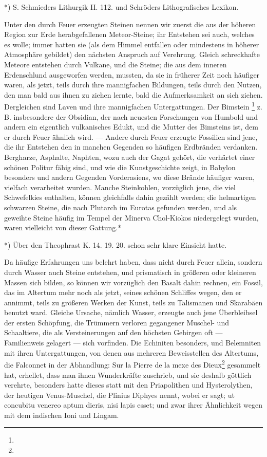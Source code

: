 \documentclass[a4paper, 11pt, oneside, polutonikogreek, german]{article}
\begin{document}
*) S. Schmieders Lithurgik II. 112. und Schröders Lithografisches Lexikon.

Unter den durch Feuer erzeugten Steinen nennen wir zuerst die aus der höheren Region zur Erde herabgefallenen Meteor-Steine; ihr Entstehen sei auch, welches es wolle; immer hatten sie (als dem Himmel entfallen oder mindestens in höherer Atmosphäre gebildet) den nächsten Anspruch auf Verehrung. Gleich schreckhafte Meteore entstehen durch Vulkane, und die Steine; die aus dem inneren Erdenschlund ausgeworfen werden, mussten, da sie in früherer Zeit noch häufiger waren, als jetzt, teils durch ihre mannigfachen Bildungen, teils durch den Nutzen, den man bald aus ihnen zu ziehen lernte, bald die Aufmerksamkeit an sich ziehen. Dergleichen sind Laven und ihre mannigfachen Untergattungen. Der Bimstein \footnote{} z. B. insbesondere der Obsidian, der nach neuesten Forschungen von Humbold und andern ein eigentlich vulkanisches Edukt, und die Mutter des Bimsteins ist, dem er durch Feuer ähnlich wird. --- Andere durch Feuer erzeugte Fossilien sind jene, die ihr Entstehen den in manchen Gegenden so häufigen Erdbränden verdanken. Bergharze, Asphalte, Naphten, wozu auch der Gagat gehört, die verhärtet einer schönen Politur fähig sind, und wie die Kunstgeschichte zeigt, in Babylon besonders und andern Gegenden Vorderasiens, wo diese Brände häufiger waren, vielfach verarbeitet wurden. Manche Steinkohlen, vorzüglich jene, die viel Schwefelkies enthalten, können gleichfalls dahin gezählt werden; die helmartigen schwarzen Steine, die nach Plutarch im Eurotas gefunden werden, und als geweihte Steine häufig im Tempel der Minerva Chol-Kiokos niedergelegt wurden, waren vielleicht von dieser Gattung.*

*) Über den Theophrast K. 14. 19. 20. schon sehr klare Einsicht hatte.

Da häufige Erfahrungen uns belehrt haben, dass nicht durch Feuer allein, sondern durch Wasser auch Steine entstehen, und prismatisch in größeren oder kleineren Massen sich bilden, so können wir vorzüglich den Basalt dahin rechnen, ein Fossil, das im Altertum mehr noch als jetzt, seines schönen Schliffes wegen, den er annimmt, teils zu größeren Werken der Kunst, teils zu Talismanen und Skarabäen benutzt ward. Gleiche Ursache, nämlich Wasser, erzeugte auch jene Überbleibsel der ersten Schöpfung, die Trümmern verloren gegangener Muschel- und Schaaltiere, die als Versteinerungen auf den höchsten Gebirgen oft --- Familienweis gelagert --- sich vorfinden. Die Echiniten besonders, und Belemniten mit ihren Untergattungen, von denen aus mehreren Beweisstellen des Altertums, die Falconnet in der Abhandlung: Sur la Pierre de la mexe des Dieux\footnote{} gesammelt hat, erhellet, dass man ihnen Wunderkräfte zuschrieb, und sie deshalb göttlich verehrte, besonders hatte dieses statt mit den Priapolithen und Hysterolythen, der heutigen Venus-Muschel, die Plinius Diphyes nennt, wobei er sagt; ut concubitu venereo aptum dieris, nisi lapis esset; und zwar ihrer Ähnlichkeit wegen mit dem indischen Ioni und Lingam.
\end{document}
